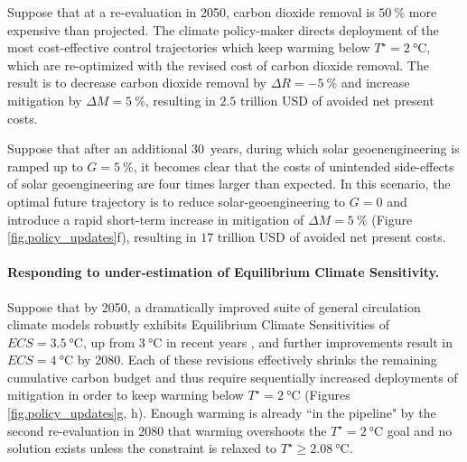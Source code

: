\documentclass{article}
\begin{document}
Suppose that at a re-evaluation in 2050, carbon dioxide removal is $\SI{50}{\%}$ more expensive than projected. The climate policy-maker directs deployment of the most cost-effective control trajectories which keep warming below $T^{\star}=\SI{2}{\celsius}$, which are re-optimized with the revised cost of carbon dioxide removal. The result is to decrease carbon dioxide removal by $\Delta R = \SI{-5}{\%}$ and increase mitigation by $\Delta M = \SI{5}{\%}$, resulting in $2.5$ trillion USD of avoided net present costs.


Suppose that after an additional \SI{30}{years}, during which solar geoenengineering is ramped up to $G=\SI{5}{\%}$, it becomes clear that the costs of unintended side-effects of solar geoengineering are four times larger than expected. In this scenario, the optimal future trajectory is to reduce solar-geoengineering to $G = 0$ and introduce a rapid short-term increase in mitigation of $\Delta M = \SI{5}{\%}$ (Figure \ref{fig.policy_updates}f), resulting in $17$ trillion USD of avoided net present costs.

\paragraph{Responding to under-estimation of Equilibrium Climate Sensitivity.}
Suppose that by 2050, a dramatically improved suite of general circulation climate models robustly exhibits Equilibrium Climate Sensitivities of $ECS=\SI{3.5}{\celsius}$, up from $\SI{3}{\celsius}$ in recent years \citep{geoffroy_transient_2012}, and further improvements result in $ECS=\SI{4}{\celsius}$ by 2080. Each of these revisions effectively shrinks the remaining cumulative carbon budget and thus require sequentially increased deployments of mitigation in order to keep warming below $T^{\star} = \SI{2}{\celsius}$ (Figures \ref{fig.policy_updates}g, h). Enough warming is already ``in the pipeline" by the second re-evaluation in 2080 that warming overshoots the $T^{\star} = \SI{2}{\celsius}$ goal and no solution exists unless the constraint is relaxed to $T^{\star} \geq \SI{2.08}{\celsius}$.
\end{document}
